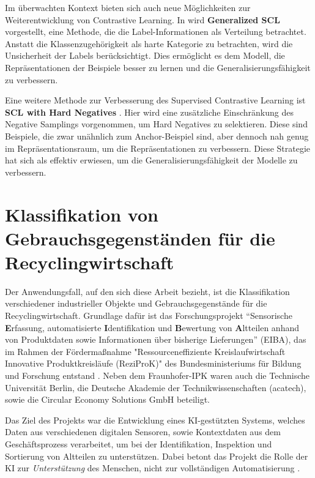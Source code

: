 Im überwachten Kontext bieten sich auch neue Möglichkeiten zur Weiterentwicklung von Contrastive Learning. In \parencite{Kim2023generalizedsupcon} wird \textbf{Generalized SCL} vorgestellt, eine Methode, die die Label-Informationen als Verteilung betrachtet. Anstatt die Klassenzugehörigkeit als harte Kategorie zu betrachten, wird die Unsicherheit der Labels berücksichtigt. Dies ermöglicht es dem Modell, die Repräsentationen der Beispiele besser zu lernen und die Generalisierungsfähigkeit zu verbessern.

Eine weitere Methode zur Verbesserung des Supervised Contrastive Learning ist \textbf{SCL with Hard Negatives} \parencite{Jiang2024supconhardnegatives}. Hier wird eine zusätzliche Einschränkung des Negative Samplings vorgenommen, um Hard Negatives zu selektieren. Diese sind Beispiele, die zwar unähnlich zum Anchor-Beispiel sind, aber dennoch nah genug im Repräsentationsraum, um die Repräsentationen zu verbessern. Diese Strategie hat sich als effektiv erwiesen, um die Generalisierungsfähigkeit der Modelle zu verbessern.

\section{Klassifikation von Gebrauchsgegenständen für die Recyclingwirtschaft} \label{sec:recycling-classification} %

Der Anwendungsfall, auf den sich diese Arbeit bezieht, ist die Klassifikation verschiedener industrieller Objekte und Gebrauchsgegenstände für die Recyclingwirtschaft. Grundlage dafür ist das Forschungsprojekt “Sensorische \textbf{E}rfassung, automatisierte \textbf{I}dentifikation und \textbf{B}ewertung von \textbf{A}ltteilen anhand von Produktdaten sowie Informationen über bisherige Lieferungen” (EIBA), das im Rahmen der Fördermaßnahme "Ressourceneffiziente Kreislaufwirtschaft \textemdash Innovative Produktkreisläufe (ReziProK)" des Bundesministeriums für Bildung und Forschung entstand \parencite{Wagner2022reziprok}. Neben dem Fraunhofer-IPK waren auch die Technische Universität Berlin, die Deutsche Akademie der Technikwissenschaften (acatech), sowie die Circular Economy Solutions GmbH beteiligt.

Das Ziel des Projekts war die Entwicklung eines KI-gestützten Systems, welches Daten aus verschiedenen digitalen Sensoren, sowie Kontextdaten aus dem Geschäftsprozess verarbeitet, um bei der Identifikation, Inspektion und Sortierung von Altteilen zu unterstützen. Dabei betont das Projekt die Rolle der KI zur \emph{Unterstützung} des Menschen, nicht zur vollständigen Automatisierung \parencite{Wagner2022reziprok}. %

